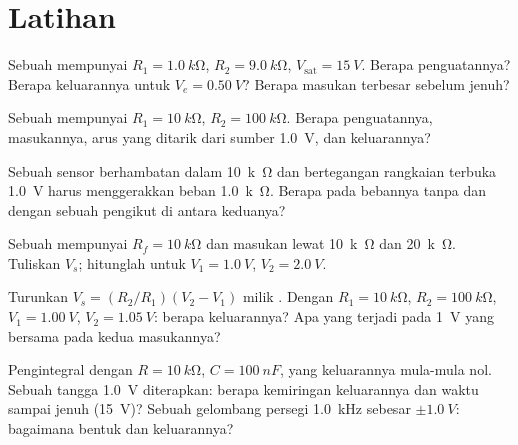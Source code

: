 \section{Latihan}

\begin{exercise}[$\star$]\label{exo:b1:operational-amplifier:1}
Sebuah  mempunyai $R_1 = \qty{1.0}{k\ohm}$, $R_2 =
\qty{9.0}{k\ohm}$, $V_{\mathrm{sat}} = \qty{15}{V}$. Berapa penguatannya?
Berapa keluarannya untuk $V_e = \qty{0.50}{V}$? Berapa masukan terbesar
sebelum jenuh?
\end{exercise}

\begin{exercise}[$\star$]\label{exo:b1:operational-amplifier:2}
Sebuah  mempunyai $R_1 = \qty{10}{k\ohm}$, $R_2 = \qty{100}{k\ohm}$.
Berapa penguatannya,  masukannya, arus yang ditarik dari sumber
\qty{1.0}{V}, dan keluarannya?
\end{exercise}

\begin{exercise}[$\star$]\label{exo:b1:operational-amplifier:3}
Sebuah sensor berhambatan dalam \qty{10}{k\ohm} dan bertegangan
rangkaian terbuka \qty{1.0}{V} harus menggerakkan beban \qty{1.0}{k\ohm}.
Berapa  pada bebannya tanpa dan dengan sebuah pengikut di antara keduanya?
\end{exercise}

\begin{exercise}[$\star$]\label{exo:b1:operational-amplifier:4}
Sebuah  mempunyai $R_f = \qty{10}{k\ohm}$ dan masukan
lewat \qty{10}{k\ohm} dan \qty{20}{k\ohm}. Tuliskan $V_s$; hitunglah
untuk $V_1 = \qty{1.0}{V}$, $V_2 = \qty{2.0}{V}$.
\end{exercise}

\begin{exercise}[$\star\star$]\label{exo:b1:operational-amplifier:5}
Turunkan $V_s = (R_2/R_1)(V_2 - V_1)$ milik . Dengan
$R_1 = \qty{10}{k\ohm}$, $R_2 = \qty{100}{k\ohm}$, $V_1 = \qty{1.00}{V}$,
$V_2 = \qty{1.05}{V}$: berapa keluarannya? Apa yang terjadi pada
\qty{1}{V} yang bersama pada kedua masukannya?
\end{exercise}

\begin{exercise}[$\star\star$]\label{exo:b1:operational-amplifier:6}
Pengintegral dengan $R = \qty{10}{k\ohm}$, $C = \qty{100}{nF}$, yang
keluarannya mula-mula nol. Sebuah tangga \qty{1.0}{V} diterapkan: berapa
kemiringan keluarannya dan waktu sampai jenuh (\qty{15}{V})? Sebuah
gelombang persegi \qty{1.0}{kHz} sebesar $\pm\qty{1.0}{V}$: bagaimana
bentuk dan  keluarannya?
\end{exercise}

